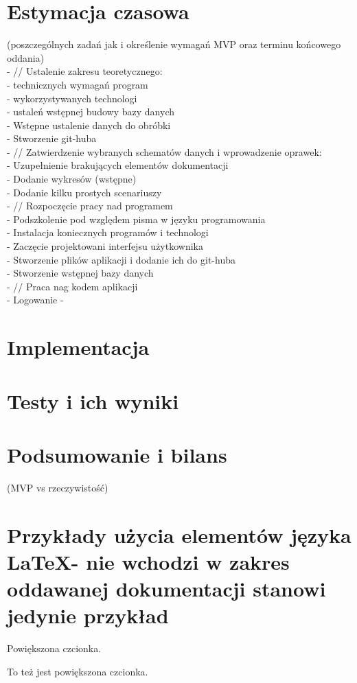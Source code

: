 \documentclass[12pt,a4paper]{article}
\begin{document}
\section{Estymacja czasowa }
(poszczególnych zadań jak i określenie wymagań MVP oraz terminu końcowego oddania)
\\
- // Ustalenie zakresu teoretycznego: \\
    - technicznych wymagań program \\
    - wykorzystywanych technologi \\
    - ustaleń wstępnej budowy bazy danych \\
    - Wstępne ustalenie danych do obróbki \\
    - Stworzenie git-huba\\
- // Zatwierdzenie wybranych schematów danych i wprowadzenie oprawek:\\
    - Uzupełnienie brakujących elementów dokumentacji\\
    - Dodanie wykresów (wstępne)\\
    - Dodanie kilku prostych scenariuszy\\
- // Rozpoczęcie pracy nad programem\\
    - Podszkolenie pod względem pisma w języku programowania \\
    - Instalacja koniecznych programów i technologi\\
    - Zaczęcie projektowani interfejsu użytkownika\\
    - Stworzenie plików aplikacji i dodanie ich do git-huba \\
    - Stworzenie wstępnej bazy danych \\
- // Praca nag kodem aplikacji\\
    - Logowanie
    - 

\newpage
\section{Implementacja}

\newpage
\section{Testy i ich wyniki}
\section{Podsumowanie i bilans}
(MVP vs rzeczywistość)

\newpage
\section{Przykłady użycia elementów języka \LaTeX - nie wchodzi w zakres oddawanej dokumentacji stanowi jedynie przykład}
\begin{large}Powiększona czcionka.\end{large}
{\large To też jest powiększona czcionka.}
\end{document}
